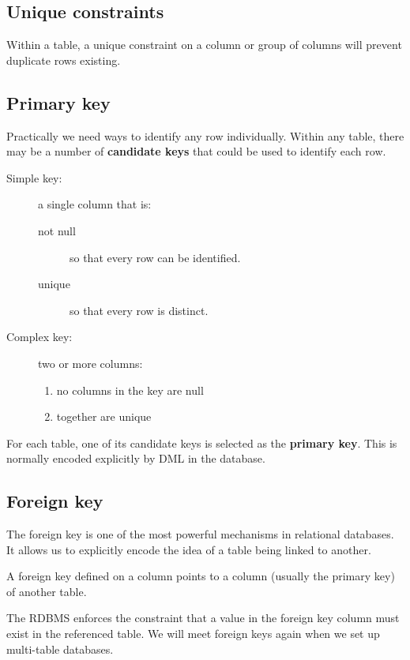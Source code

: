 \documentclass[slides]{pgnotes}
\begin{document}
\subsection{Unique constraints}

Within a table, a unique constraint on a column or group of columns will prevent duplicate rows existing.  

\subsection{Primary key}

Practically we need ways to identify any row individually.
Within any table, there may be a number of \textbf{candidate keys} that could be used to identify each row.
\begin{description}
\item[Simple key:] a single column that is:
  \begin{description}
  \item[not null] so that every row can be identified.
  \item[unique] so that every row is distinct. 
  \end{description}
\item[Complex key:] two or more columns:
  \begin{enumerate}
  \item no columns in the key are null
  \item together are unique
  \end{enumerate}
\end{description}
For each table, one of its candidate keys is selected as the \textbf{primary key}.
This is normally encoded explicitly by DML in the database.


\subsection{Foreign key}

The foreign key is one of the most powerful mechanisms in relational databases.
It allows us to explicitly encode the idea of a table being linked to another.

A foreign key defined on a column points to a column (usually the primary key) of another table.

The RDBMS enforces the constraint that a value in the foreign key column must exist in the referenced table.
We will meet foreign keys again when we set up multi-table databases.
\end{document}
